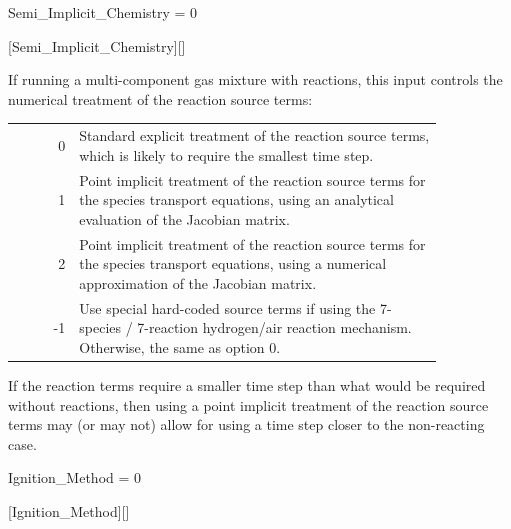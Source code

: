 
\begin{nmldescitem}
Semi_Implicit_Chemistry = 0
\end{nmldescitem}
[Semi\_Implicit\_Chemistry][]

\begin{nmldescbody}
If running a multi-component gas mixture with reactions, this input controls
the numerical treatment of the reaction source terms:

\begin{tabular}{ @{} r @{ = } p{0.85\linewidth} @{} }
   0 & Standard explicit treatment of the reaction source terms, which is
       likely to require the smallest time step.\\
   1 & Point implicit treatment of the reaction source terms for the species
       transport equations, using an analytical evaluation of the Jacobian
       matrix.\\
   2 & Point implicit treatment of the reaction source terms for the species
       transport equations, using a numerical approximation of the Jacobian
       matrix.\\
  -1 & Use special hard-coded source terms if using the 7-species \slash
       7-reaction hydrogen\slash air reaction mechanism.
       Otherwise, the same as option 0.
\end{tabular}

If the reaction terms require a smaller time step than what would be
required without reactions, then using a point implicit treatment of the
reaction source terms may (or may not) allow for using a time step closer
to the non-reacting case.
\vspace{3pt}
\end{nmldescbody}


\FINALFIX{\newpage}
\begin{nmldescitem}
Ignition_Method = 0
\end{nmldescitem}
[Ignition\_Method][]

